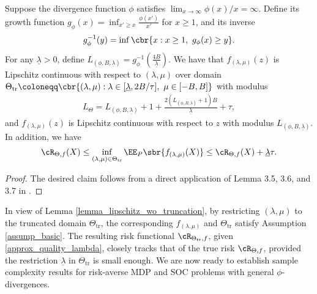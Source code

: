 \documentclass[9pt]{article}
\numberwithin{equation}{section}
\renewcommand{\frac}[2]{\tfrac{#1}{#2}}
\begin{document}
 
 
\begin{lemma}\label{lemma_lipschitz_wo_truncation}
Suppose the divergence function $\phi$ satisfies $\lim_{x \to \infty} \phi(x) / x = \infty$. 
Define its growth function $g_\phi(x) = \inf_{x' \geq x} \frac{\phi(x')}{x'}$ for $x \geq 1$,  and its inverse 
\begin{align*}
g_{\phi}^{-1} (y) = \inf \cbr{x: x \geq 1, ~ g_\phi(x) \geq y}.
\end{align*}
For any $\underline{\lambda} > 0$,
define $L_{(\phi, B, \underline{\lambda})} = g_\phi^{-1} ({ \frac{4B}{ \underline{\lambda}}})$. 
We have that 
$
f_{(\lambda, \mu)}(z) 
$
is Lipschitz continuous with respect to $(\lambda, \mu)$  over domain 
$
\Theta_{\mathrm{tr}} \coloneqq \cbr{(\lambda, \mu): \lambda \in [ \underline{\lambda}, 2B/\tau], ~ \mu \in [-B, B]}
$
with  modulus 
\begin{align*}
L_\Theta = L_{(\phi, B, \underline{\lambda})} + 1 + \tfrac{2(L_{(\phi, B, \underline{\lambda})} + 1) B}{\underline{\lambda}} + \tau,
\end{align*}
and $
f_{(\lambda, \mu)}(z) 
$
is Lipschitz continuous  with respect to $z$
with modulus 
$
 L_{(\phi, B, \underline{\lambda})} .
$
In addition, we have 
\begin{align}\label{approx_quality_lambda}
\cR_{\Theta , f}(X) \leq \inf_{(\lambda, \mu) \in \Theta_{\mathrm{tr}} } \EE_P \sbr{f_{(\lambda, \mu)}(X)} \leq \cR_{\Theta , f}(X) + \underline{\lambda} \tau.
\end{align}
\end{lemma}

\begin{proof}
The desired claim follows from a direct application of Lemma 3.5, 3.6, and 3.7 in \cite{li2026sample}.
\end{proof}


In view of Lemma \ref{lemma_lipschitz_wo_truncation}, by restricting $(\lambda, \mu)$ to the truncated domain $\Theta_{\mathrm{tr}}$, the corresponding 
$f_{(\lambda, \mu)}$ and $\Theta_{\mathrm{tr}}$ satisfy Assumption \ref{assump_basic}.
The resulting risk functional $\cR_{\Theta_{\mathrm{tr}} , f}$, given \eqref{approx_quality_lambda}, 
closely tracks that of the true risk $\cR_{\Theta, f}$, provided the restriction $\underline{\lambda}$ in $\Theta_{\mathrm{tr}}$ is small enough. 
We are now ready to establish sample complexity results for risk-averse MDP and SOC problems with general $\phi$-divergences. 
\end{document}
